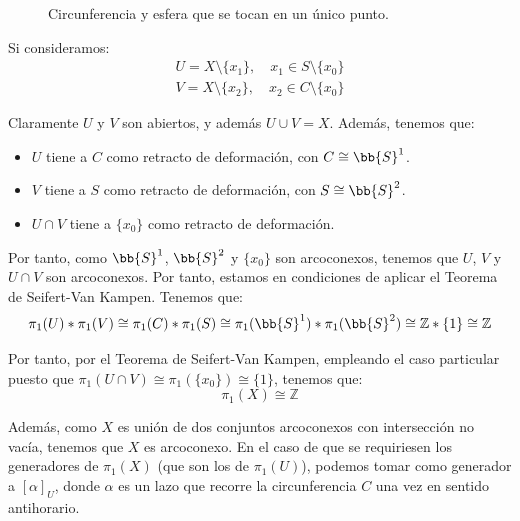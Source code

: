 \begin{ejercicio}
\begin{enumerate}[label=\alph*)]
\begin{figure}[h]
                \caption{Circunferencia y esfera que se tocan en un único punto.}
                \label{fig:conjuntoX_Aux}
            \end{figure}
            Si consideramos:
            \begin{gather*}
                U = X\setminus \{x_1\}, \quad x_1\in S\setminus \{x_0\} \\
                V= X\setminus\{x_2\}, \quad x_2\in C\setminus\{x_0\}
            \end{gather*}

            Claramente $U$ y $V$ son abiertos, y además $U\cup V = X$. Además, tenemos que:
            \begin{itemize}
                \item $U$ tiene a $C$ como retracto de deformación, con $C\cong \bb{S}^1$.
                \item $V$ tiene a $S$ como retracto de deformación, con $S\cong \bb{S}^2$.
                \item $U\cap V$ tiene a $\{x_0\}$ como retracto de deformación.
            \end{itemize}

            Por tanto, como $\bb{S}^1$, $\bb{S}^2$ y $\{x_0\}$ son arcoconexos, tenemos que $U$, $V$ y $U\cap V$ son arcoconexos. Por tanto, estamos en condiciones de aplicar el Teorema de Seifert-Van Kampen. Tenemos que:
            \begin{equation*}
                \pi_1(U)\ast \pi_1(V) \cong \pi_1(C)\ast \pi_1(S) \cong \pi_1(\bb{S}^1)\ast \pi_1(\bb{S}^2) \cong \mathbb{Z}\ast \{1\} \cong \mathbb{Z}
            \end{equation*}

            Por tanto, por el Teorema de Seifert-Van Kampen, empleando el caso particular puesto que $\pi_1(U\cap V) \cong \pi_1(\{x_0\}) \cong \{1\}$, tenemos que:
            \begin{equation*}
                \pi_1(X) \cong \mathbb{Z}
            \end{equation*}

            Además, como $X$ es unión de dos conjuntos arcoconexos con intersección no vacía, tenemos que $X$ es arcoconexo. En el caso de que se requiriesen los generadores de $\pi_1(X)$ (que son los de $\pi_1(U)$), podemos tomar como generador a $[\alpha]_{U}$, donde $\alpha$ es un lazo que recorre la circunferencia $C$ una vez en sentido antihorario.


\end{enumerate}
\end{ejercicio}
